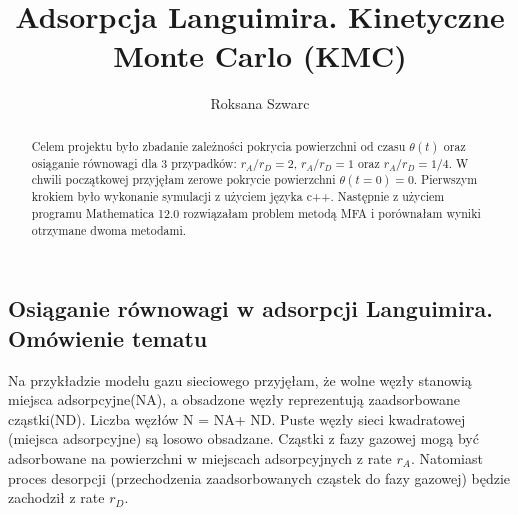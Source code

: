 \documentclass[]{report}
\title{Adsorpcja Languimira. Kinetyczne Monte Carlo (KMC)}
\author{Roksana Szwarc}
\begin{document}
\maketitle

\begin{abstract}
	 Celem projektu było zbadanie zależności pokrycia powierzchni od czasu $\theta (t)$ oraz osiąganie równowagi dla 3 przypadków:  $r_A/r_D = 2$, $r_A/r_D = 1$  oraz $r_A/r_D =1/4$. W chwili początkowej przyjęłam zerowe pokrycie powierzchni $\theta (t = 0) = 0$. Pierwszym krokiem było wykonanie symulacji z użyciem języka c++. Następnie z użyciem programu Mathematica 12.0 rozwiązałam problem metodą MFA i porównałam wyniki otrzymane dwoma metodami.
\end{abstract}
\subsection{Osiąganie równowagi w adsorpcji Languimira. Omówienie tematu}
Na przykładzie modelu gazu sieciowego przyjęłam, że wolne węzły stanowią miejsca adsorpcyjne(NA), a obsadzone węzły reprezentują zaadsorbowane cząstki(ND). Liczba węzłów N = NA+ ND. Puste węzły sieci kwadratowej (miejsca adsorpcyjne) są losowo obsadzane. Cząstki z fazy gazowej mogą być adsorbowane na powierzchni w miejscach adsorpcyjnych z rate $r_A$. Natomiast proces desorpcji (przechodzenia zaadsorbowanych cząstek do fazy gazowej) będzie zachodził z rate  $r_D$. 
\end{document}
